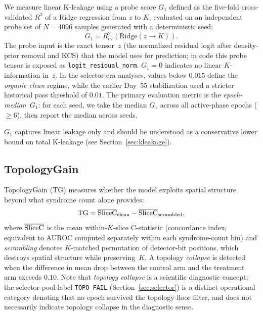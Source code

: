 We measure linear K-leakage using a probe score $G_1$ defined as the five-fold cross-validated $R^2$ of a Ridge regression from $z$ to $K$, evaluated on an independent probe set of $N{=}4096$ samples generated with a deterministic seed:
\begin{equation}
G_1 = R^2_{\mathrm{cv}}\!\left(\mathrm{Ridge}(z \to K)\right).
\end{equation}
The probe input is the exact tensor~$z$ (the normalized residual logit after density-prior removal and KCS) that the model uses for prediction; in code this probe tensor is exposed as \texttt{logit\_residual\_norm}. $G_1 = 0$ indicates no linear $K$-information in~$z$. In the selector-era analyses, values below $0.015$ define the \emph{organic clean} regime, while the earlier Day~55 stabilization used a stricter historical pass threshold of $0.01$. The primary evaluation metric is the \emph{epoch-median~$G_1$}: for each seed, we take the median $G_1$ across all active-phase epochs ($\geq 6$), then report the median across seeds.

$G_1$ captures linear leakage only and should be understood as a conservative lower bound on total K-leakage (see Section~\ref{sec:kleakage}).

\subsection{TopologyGain}

TopologyGain (TG) measures whether the model exploits spatial structure beyond what syndrome count alone provides:
\begin{equation}
\mathrm{TG} = \overline{\mathrm{SliceC}}_{\text{clean}} - \overline{\mathrm{SliceC}}_{\text{scrambled}},
\end{equation}
where $\overline{\mathrm{SliceC}}$ is the mean within-$K$-slice C-statistic (concordance index, equivalent to AUROC computed separately within each syndrome-count bin) and \emph{scrambling} denotes $K$-matched permutation of detector-bit positions, which destroys spatial structure while preserving~$K$. A topology \emph{collapse} is detected when the difference in mean drop between the control arm and the treatment arm exceeds $0.10$. Note that \emph{topology collapse} is a scientific diagnostic concept; the selector pool label \texttt{TOPO\_FAIL} (Section~\ref{sec:selector}) is a distinct operational category denoting that no epoch survived the topology-floor filter, and does not necessarily indicate topology collapse in the diagnostic sense.
